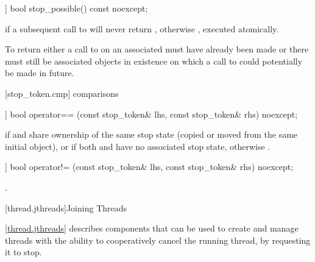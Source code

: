 {%
\begin{itemdecl}
[[nodiscard]] bool stop_possible() const noexcept;
\end{itemdecl}
\begin{itemdescr}
  \pnum\returns {} if a subsequent call to  will never return ,
                otherwise , executed atomically.
                \begin{note}To return  either a call to 
                  on an associated  must have already been made or there
                  must still be associated  objects in existence on which
                  a call to  could potentially be made in future.
                \end{note}
\end{itemdescr}


[stop_token.cmp]{ comparisons}

%
\begin{itemdecl}
[[nodiscard]] bool operator== (const stop_token& lhs, const stop_token& rhs) noexcept;
\end{itemdecl}
\begin{itemdescr}
  \pnum\returns {} if  and  share ownership
                of the same stop state
                (copied or moved from the same initial  object),
                or if both  and  have no associated stop state,
                otherwise .
\end{itemdescr}

%
\begin{itemdecl}
[[nodiscard]] bool operator!= (const stop_token& lhs, const stop_token& rhs) noexcept;
\end{itemdecl}
\begin{itemdescr}
  \pnum\returns {}.
\end{itemdescr}


\clearpage

[thread.jthreads]{Joining Threads}

\pnum
\ref{thread.jthreads} describes components that can be used to create and manage threads
with the ability to
cooperatively cancel the running thread, by requesting it to stop.

}
